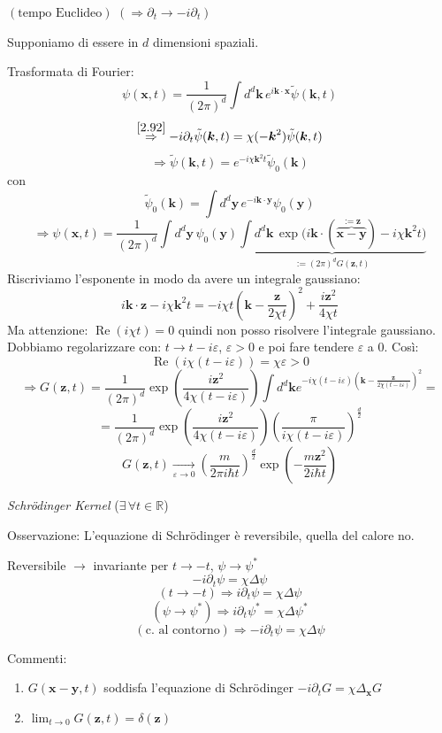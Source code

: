 \documentclass[a4paper,11pt]{report}
\newcommand{\vect}[1]{\boldsymbol{#1}}
\newcommand{\R}{\mathbb{R}}
\newcommand{\x}{\boldsymbol{x}}
\newcommand{\y}{\boldsymbol{y}}
\newcommand{\kk}{\boldsymbol{k}}
\newcommand{\z}{\boldsymbol{z}}
\begin{document}
$(\text{tempo Euclideo})$ $(\Rightarrow \partial _t \rightarrow -i\partial_t)$

Supponiamo di essere in $d$ dimensioni spaziali. 

Trasformata di Fourier:
\[
\psi(\x,t)=\frac{1}{(2\pi)^d}\int d^d\kk\, e^{i\kk\cdot \x}\tilde{\psi}(\kk,t)
\]
\[
\overset{\eqref{2.92}}{\Rightarrow} -i\partial_t \tilde{\psi}(\kk,t)=\chi (-\kk ^2)\tilde{\psi}(\kk,t)
\]
\[
\Rightarrow \tilde{\psi}(\kk,t) = e^{-i\chi\kk^2 t}\tilde{\psi}_0(\kk)
\]
con
\[
\tilde{\psi}_0(\kk)=\int d^d \y\, e^{-i\kk\cdot \y} \psi_0(\y)
\]
\[
\Rightarrow \psi(\x,t) = \frac{1}{(2\pi)^d}\int d^d \y\, \psi_0(\y) \underbrace{\int d^d\kk\, \exp\Big({i\kk \cdot (\overbrace{\x-\y}^{:=\vect{z}}) - i\chi \kk^2 t}\Big)}_{:=(2\pi)^d G(\z,t)}
\]
Riscriviamo l'esponente in modo da avere un integrale gaussiano:
\[
i\kk \cdot \z - i \chi \kk^2 t = -i\chi t\left(\kk - \frac{\z}{2\chi t}\right)^2 + \frac{i\z^2}{4\chi t}
\]
Ma attenzione: $\operatorname{Re}(i\chi t)=0$ quindi non posso risolvere l'integrale gaussiano. Dobbiamo regolarizzare con: $t\rightarrow t-i\varepsilon$, $\varepsilon>0$ e poi fare tendere $\varepsilon$ a 0. Cos\`i:
\[
\operatorname{Re}(i\chi(t-i\varepsilon))=\chi\varepsilon >0
\]
\[
\Rightarrow G(\z,t)=\frac{1}{(2\pi)^d}\exp \left(\frac{i\z^2}{4\chi(t-i\varepsilon)}\right) \int d^d\kk e^{-i\chi(t-i\varepsilon)\left( \kk -\frac{\z}{2\chi(t-i\varepsilon)}\right)^2}=
\]
\[
=\frac{1}{(2\pi)^d}\exp\left(\frac{i\z^2}{4\chi(t-i\varepsilon)}\right) \left( \frac{\pi}{i\chi(t-i\varepsilon)} \right)^\frac{d}{2}
\]
\begin{equation}
G(\z,t)\underset{\varepsilon \to 0}{\rightarrow} \left(\frac{m}{2\pi i \hbar t}\right)^{\frac{d}{2}}\exp \left(-\frac{m\z^2}{2i\hbar t}  \right)
\label{2.93}
\end{equation}
\centerline{\emph{Schr\"odinger Kernel} ($\exists\, \forall t\in \R$)}

\smallskip

Osservazione: L'equazione di Schr\"odinger \`e reversibile, quella del calore no.

Reversibile $\rightarrow$ invariante per $t \to -t$, $\psi \to \psi^*$
\[
-i\partial_t \psi =\chi \Delta \psi
\]
\[
(t\to -t)\Rightarrow i\partial_t\psi=\chi\Delta \psi
\]
\[
(\psi \to \psi^*)\Rightarrow i\partial_t\psi^*=\chi\Delta \psi^*
\]
\[
(\text{c. al contorno})\Rightarrow -i\partial_t\psi=\chi\Delta\psi
\]

Commenti:
\begin{enumerate}[label=(\roman*)]
\item $G(\x-\y,t)$ soddisfa l'equazione di Schr\"odinger $-i\partial_t G = \chi \Delta_{\x}G$
\item $\lim_{t\to 0} G(\z,t)=\delta(\z)$
\end{enumerate}
\end{document}
